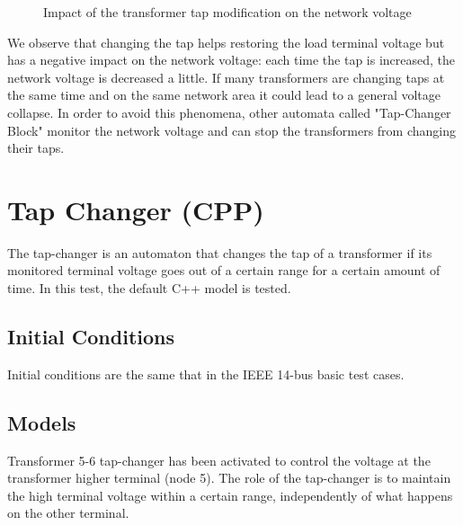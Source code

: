 \documentclass[a4paper, 12pt]{report}
\begin{document}
\begin{figure}[H]
\caption{Impact of the transformer tap modification on the network voltage}
\end{figure}

We observe that changing the tap helps restoring the load terminal voltage but has a negative impact on the network voltage: each time the tap is increased, the network voltage is decreased a little. If many transformers are changing taps at the same time and on the same network area it could lead to a general voltage collapse. In order to avoid this phenomena, other automata called "Tap-Changer Block" monitor the network voltage and can stop the transformers from changing their taps.


\newpage
\section{Tap Changer (CPP)}
\label{TapChangerAutomatonCpp}

The tap-changer is an automaton that changes the tap of a transformer if its monitored terminal voltage goes out of a certain range for a certain amount of time. In this test, the default C++ model is tested.

\subsection{Initial Conditions}

Initial conditions are the same that in the IEEE 14-bus basic test cases.

\subsection{Models}

Transformer 5-6 tap-changer has been activated to control the voltage at the transformer higher terminal (node 5). The role of the tap-changer is to maintain the high terminal voltage within a certain range, independently of what happens on the other terminal. \\
\end{document}
